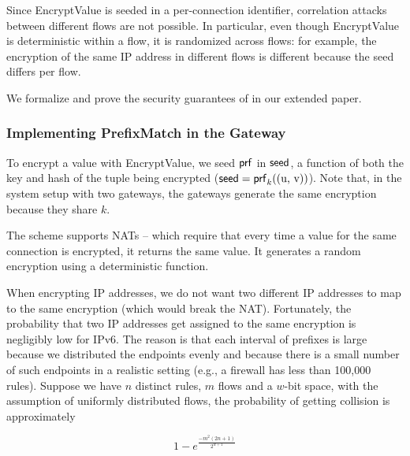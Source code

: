 %
Since EncryptValue is seeded in a per-connection identifier, correlation attacks between different flows are not possible. 
In particular, even though EncryptValue is deterministic within a flow, it is randomized across flows:
 for example, the encryption of the same IP address in different flows is different because the seed differs per flow. 


We formalize and prove the security guarantees of \pmatch{} in our extended paper. 

\subsubsection{Implementing PrefixMatch in the Gateway}
\label{sec:tree}






To encrypt a value with EncryptValue, we seed $\mathsf{prf}$ in $\mathsf{seed}$, a function of both the key and hash of the tuple being encrypted ($\mathsf{seed} = \mathsf{prf}_k(\text{(u, v)})$). Note that, in the system setup with two gateways, the gateways generate the same encryption because they share $k$.  

The scheme supports NATs -- which require that every time a value for the same connection is encrypted, it returns the same value. It generates a random encryption using a deterministic function. 

When encrypting IP addresses, we do not want two different IP addresses to map to the same encryption (which would break the NAT). Fortunately, the probability that two IP addresses get assigned to the same encryption is negligibly low for IPv6.  The reason is that each interval of prefixes is large because we distributed the endpoints evenly and because there is a small number of such endpoints in a realistic setting (e.g., a firewall has less than 100,000 rules). Suppose we have $n$ distinct rules, $m$ flows and a $w$-bit space, with the assumption of uniformly distributed flows, the probability of getting collision is approximately 

\begin{equation}
1 - e^\frac{-m^2 (2n+1)}{2^{w+1}}
\end{equation}



